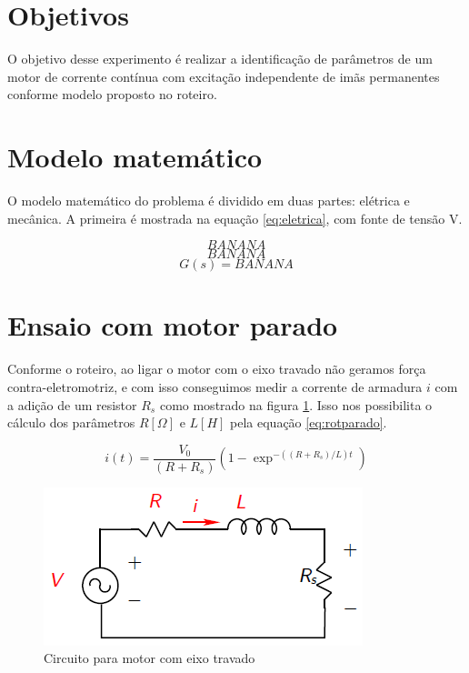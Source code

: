 \documentclass{article}
\begin{document}


\onehalfspacing
\section{Objetivos} 
O objetivo desse experimento é realizar a identificação de parâmetros de um motor de corrente contínua com excitação independente de imãs permanentes conforme modelo proposto no roteiro\cite{bb:roteiro}. 
	
\section{Modelo matemático}
O modelo matemático do problema é dividido em duas partes: elétrica e mecânica. A primeira é mostrada na equação \ref{eq:eletrica}, com fonte de tensão V. 

\begin{equation}
\label{eq:eletrica}
BANANA%
\end{equation}
\begin{equation}
\label{eq:mecanica}
BANANA%
\end{equation}
\begin{equation}
\label{eq:gss}
G(s)=BANANA%
\end{equation}
\section{Ensaio com motor parado}
Conforme o roteiro\cite{bb:roteiro}, ao ligar o motor com o eixo travado não geramos força contra-eletromotriz, e com isso conseguimos medir a corrente de armadura $i$ com a adição de um resistor $R_s$ como mostrado na figura \ref{fig:rotparado}. Isso nos possibilita o cálculo dos parâmetros $R [\Omega]$ e $L [H]$ pela equação \ref{eq:rotparado}.

\begin{equation}
\label{eq:rotparado}
i(t) = \frac{V_0}{(R+R_s)}(1-\exp^{-((R+R_s)/L)t})
\end{equation}

\begin{figure}[H]
	\centering
	\includegraphics[width=0.8\linewidth]{rotparado}
	\caption{Circuito para motor com eixo travado}
	\label{fig:rotparado}
\end{figure}
\end{document}
